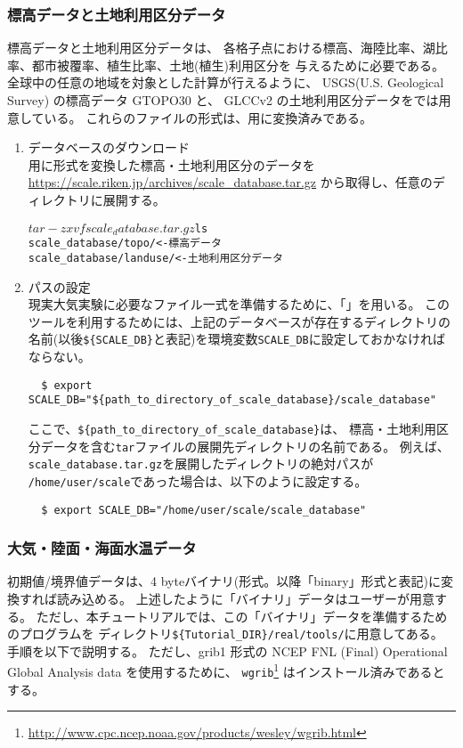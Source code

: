\subsubsection{標高データと土地利用区分データ}
標高データと土地利用区分データは、
各格子点における標高、海陸比率、湖比率、都市被覆率、植生比率、土地(植生)利用区分を
与えるために必要である。
全球中の任意の地域を対象とした計算が行えるように、
USGS(U.S. Geological Survey) の標高データ GTOPO30 と、
GLCCv2 の土地利用区分データを{\scalerm}では用意している。
これらのファイルの形式は、{\scalerm}用に変換済みである。

\begin{enumerate}
\item データベースのダウンロード\\
\scalerm 用に形式を変換した標高・土地利用区分のデータを
 \url{https://scale.riken.jp/archives/scale_database.tar.gz}
から取得し、任意のディレクトリに展開する。
\begin{alltt}
  $ tar -zxvf scale_database.tar.gz
  $ ls
    scale_database/topo/    <- 標高データ
    scale_database/landuse/ <- 土地利用区分データ
\end{alltt}

\item パスの設定\\
現実大気実験に必要なファイル一式を準備するために、「{\makeconftool}」を用いる。
このツールを利用するためには、上記のデータベースが存在するディレクトリの名前(以後\verb|${SCALE_DB}|と表記)を環境変数\verb|SCALE_DB|に設定しておかなければならない。
\begin{verbatim}
  $ export SCALE_DB="${path_to_directory_of_scale_database}/scale_database"
\end{verbatim}
ここで、\verb|${path_to_directory_of_scale_database}|は、
標高・土地利用区分データを含む\verb|tar|ファイルの展開先ディレクトリの名前である。
例えば、\verb|scale_database.tar.gz|を展開したディレクトリの絶対パスが
\verb|/home/user/scale|であった場合は、以下のように設定する。
\begin{verbatim}
  $ export SCALE_DB="/home/user/scale/scale_database"
\end{verbatim}
\end{enumerate}

\subsubsection{大気・陸面・海面水温データ}
初期値/境界値データは、4 byteバイナリ(\grads 形式。以降「binary」形式と表記)に変換すれば読み込める。
上述したように「バイナリ」データはユーザーが用意する。
ただし、本チュートリアルでは、この「バイナリ」データを準備するためのプログラムを
ディレクトリ\verb|${Tutorial_DIR}/real/tools/|に用意してある。
手順を以下で説明する。
ただし、grib1 形式の NCEP FNL (Final) Operational Global Analysis data を使用するために、
\verb|wgrib|\footnote{
\url{http://www.cpc.ncep.noaa.gov/products/wesley/wgrib.html}
}
はインストール済みであるとする。

